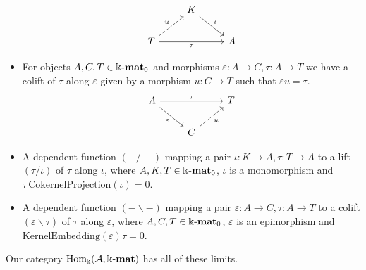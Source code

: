 \begin{example}
\begin{itemize}
\[
\begin{tikzcd}
                                              & K \arrow[rd, "\iota"] &   \\
T \arrow[rr, "\tau"'] \arrow[ru, "u", dashed] &                       & A
\end{tikzcd}
\]
\item For objects $A,C,T \in \Bbbk\textnormal{-}\mathbf{mat}_{0}$ and morphisms $\varepsilon : A \rightarrow C, \tau : A \rightarrow T$ we have a colift of $\tau$ along
$\varepsilon$ given by a morphism $u : C \rightarrow T$ such that $\varepsilon u = \tau$.
\[
\begin{tikzcd}
A \arrow[rr, "\tau"] \arrow[rd, "\varepsilon"'] &                            & T \\
                                                & C \arrow[ru, "u"', dashed] &  
\end{tikzcd}
\]
\item A dependent function $( - / - )$ mapping a pair $\iota : K \rightarrow A, \tau : T \rightarrow A$ to a lift $(\tau / \iota )$ of
$\tau$ along $\iota$, where $A, K, T \in \Bbbk\textnormal{-}\mathbf{mat}_{0}$, $\iota$ is a monomorphism and $\tau\,\mathrm{CokernelProjection}(\iota) = 0$.
\item A dependent function $( - \backslash - )$ mapping a pair $\varepsilon : A \rightarrow C, \tau : A \rightarrow T$ to a colift
$(\varepsilon \backslash \tau )$ of
$\tau$ along $\varepsilon$, where $A, C, T \in \Bbbk\textnormal{-}\mathbf{mat}_{0}$, $\varepsilon$ is an epimorphism and $\mathrm{KernelEmbedding}(\varepsilon)\tau = 0$.
\end{itemize}
\end{example}

Our category $\mathrm{Hom_{\Bbbk}}(\mathcal{A},\Bbbk\textnormal{-}\mathbf{mat})$ has all of these limits.


